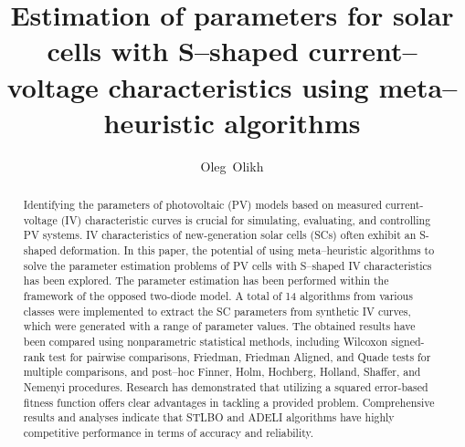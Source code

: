\documentclass[a4paper,fleqn]{cas-dc}
\begin{document}
\let\WriteBookmarks\relax
\def\floatpagepagefraction{1}
\def\textpagefraction{.001}



\title [mode = title]{Estimation of parameters for solar cells with S--shaped current--voltage characteristics using meta--heuristic algorithms}

%
\author{Oleg~Olikh}




\begin{abstract}
Identifying the parameters of photovoltaic (PV) models based on measured current-voltage (IV) characteristic curves
is crucial for simulating, evaluating, and controlling PV systems.
IV characteristics of new-generation solar cells (SCs) often exhibit an S-shaped deformation.
In this paper, the potential of using meta--heuristic algorithms
to solve the parameter estimation problems of PV cells
with S--shaped IV characteristics has been explored.
The parameter estimation has been performed within the framework of the opposed two-diode model.
A total of 14 algorithms from various classes were implemented
to extract the SC parameters from synthetic IV curves, which were generated with a range of parameter values.
The obtained results have been compared using nonparametric statistical methods,
including Wilcoxon signed-rank test for pairwise comparisons,
Friedman, Friedman Aligned, and Quade tests for multiple comparisons,
and post--hoc Finner, Holm, Hochberg, Holland,  Shaffer, and Nemenyi procedures.
Research has demonstrated that utilizing a squared error-based fitness function offers clear advantages in tackling a provided problem.
Comprehensive results and analyses indicate that STLBO and ADELI algorithms have highly competitive performance in terms of accuracy and reliability.
\end{abstract}
\end{document}

